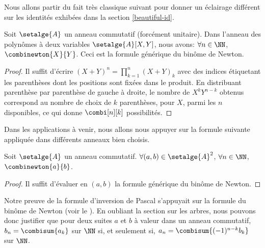 Nous allons partir du fait très classique suivant pour donner un éclairage différent sur les identités exhibées dans la section \ref{beautiful-id}.




\begin{fact} \label{bino-id-formal}
	Soit $\setalge{A}$ un anneau commutatif (forcément unitaire).
	Dans l'anneau des polynômes à deux variables $\setalge{A}[X, Y]$, nous avons:
	$\forall n \in \NN$,
	$\combinewton{X}{Y}$.
	Ceci est la formule générique du binôme de Newton.
\end{fact}


\begin{proof}
	Il suffit d'écrire $(X + Y)^n = \prod_{k=1}^{n} (X + Y)_k$ avec des indices étiquetant les parenthèses dont les positions sont fixées dans le produit.
    En distribuant parenthèse par parenthèse de gauche à droite, le nombre de $X^k Y^{n-k}$ obtenus correspond au nombre de choix de $k$ parenthèses, pour $X$, parmi les $n$ disponibles, ce qui donne $\combi[n][k]$ possibilités.
\end{proof}




Dans les applications à venir, nous allons nous appuyer sur la formule suivante appliquée dans différents anneaux bien choisis.


\begin{fact} \label{bino-id-a-b}
	Soit $\setalge{A}$ un anneau commutatif.
	$\forall (a, b) \in \setalge{A}^2$,
	$\forall n \in \NN$,
	$\combinewton{a}{b}$.
\end{fact}


\begin{proof}
	Il suffit d'évaluer en $(a, b)$ la formule générique du binôme de Newton.
\end{proof}




\begin{remark}
	Notre preuve de la formule d'inversion de Pascal s'appuyait sur la formule du binôme de Newton (voir le ).
	En oubliant la section sur les arbres, nous pouvons donc justifier que pour deux suites $a$ et $b$ à valeur dans un anneau commutatif,
	$b_n = \combisum{a_k}$ sur $\NN$
	si, et seulement si,
	$a_n = \combisum{(-1)^{n-k} b_k}$ sur $\NN$.
\end{remark}


